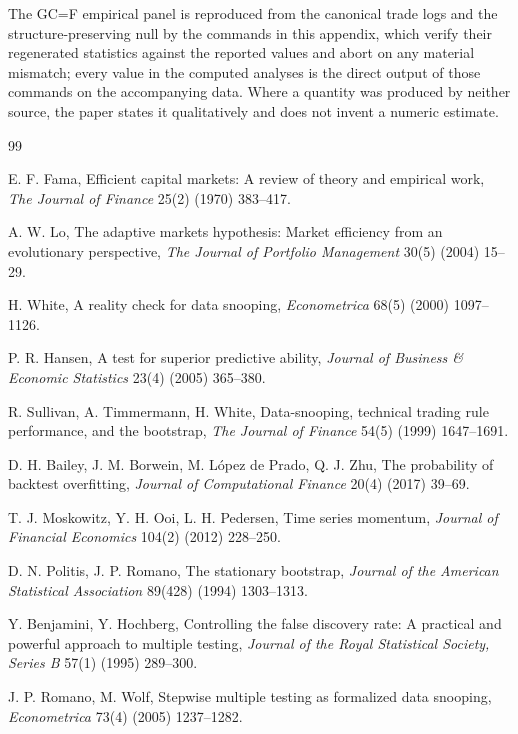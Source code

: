 \documentclass[preprint,12pt]{elsarticle}
\theoremstyle{definition}
\begin{document}
The GC=F empirical panel is reproduced from the canonical trade logs and the structure-preserving null by the commands in this appendix, which verify their regenerated statistics against the reported values and abort on any material mismatch; every value in the computed analyses is the direct output of those commands on the accompanying data. Where a quantity was produced by neither source, the paper states it qualitatively and does not invent a numeric estimate.



\begin{thebibliography}{99}

E. F. Fama, Efficient capital markets: A review of theory and empirical work,
\emph{The Journal of Finance} 25(2) (1970) 383--417.

A. W. Lo, The adaptive markets hypothesis: Market efficiency from an evolutionary perspective,
\emph{The Journal of Portfolio Management} 30(5) (2004) 15--29.

H. White, A reality check for data snooping,
\emph{Econometrica} 68(5) (2000) 1097--1126.

P. R. Hansen, A test for superior predictive ability,
\emph{Journal of Business \& Economic Statistics} 23(4) (2005) 365--380.

R. Sullivan, A. Timmermann, H. White, Data-snooping, technical trading rule performance, and the bootstrap,
\emph{The Journal of Finance} 54(5) (1999) 1647--1691.

D. H. Bailey, J. M. Borwein, M. L\'opez de Prado, Q. J. Zhu,
The probability of backtest overfitting,
\emph{Journal of Computational Finance} 20(4) (2017) 39--69.

T. J. Moskowitz, Y. H. Ooi, L. H. Pedersen, Time series momentum,
\emph{Journal of Financial Economics} 104(2) (2012) 228--250.

D. N. Politis, J. P. Romano, The stationary bootstrap,
\emph{Journal of the American Statistical Association} 89(428) (1994) 1303--1313.

Y. Benjamini, Y. Hochberg, Controlling the false discovery rate: A practical and powerful approach to multiple testing,
\emph{Journal of the Royal Statistical Society, Series B} 57(1) (1995) 289--300.

J. P. Romano, M. Wolf, Stepwise multiple testing as formalized data snooping,
\emph{Econometrica} 73(4) (2005) 1237--1282.


\end{thebibliography}
\end{document}
